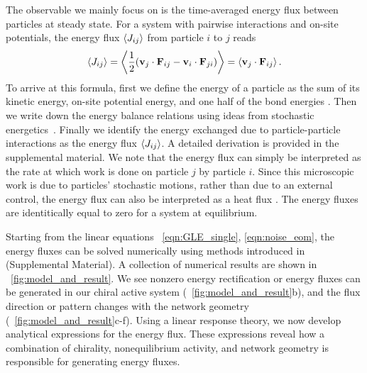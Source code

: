 \documentclass[
 preprint,
 preprintnumbers,
 amsmath,amssymb,
 aps,
 pre,
 longbibliography,
 superscriptaddress,
 10pt, twocolumn
]{revtex4-1}
\begin{document}
The observable we mainly focus on is the time-averaged energy flux between particles at steady state. For a system with pairwise interactions and on-site potentials, the energy flux $\expval{J_{ij}}$ from particle $i$ to $j$ reads
\begin{equation} \label{eqn:flux_def}
    \expval{J_{ij}} = \expval{\frac{1}{2} (\mathbf{v}_j \cdot \mathbf{F}_{ij} - \mathbf{v}_i \cdot \mathbf{F}_{ji})}
    = \expval{\mathbf{v}_j \cdot \mathbf{F}_{ij}}.
\end{equation}
To arrive at this formula, first we define the energy of a particle as the sum of its kinetic energy, on-site potential energy, and one half of the bond energies \cite{Lepri2003ThermalConduction}. Then we write down the energy balance relations using ideas from stochastic energetics~\cite{Sekimoto1998LangevinEquation}. Finally we identify the energy exchanged due to particle-particle interactions as the energy flux $\expval{J_{ij}}$. A detailed derivation is provided in the supplemental material.
We note that the energy flux can simply be interpreted as the rate at which work is done on particle $j$ by particle $i$.
Since this microscopic work is due to particles' stochastic motions, rather than due to an external control, the energy flux can also be interpreted as a heat flux \cite{Sekimoto1998LangevinEquation,Lepri2003ThermalConduction}. The energy fluxes are identitically equal to zero for a system at equilibrium.

Starting from the linear equations \eqnname~\eqref{eqn:GLE_single}, \eqref{eqn:noise_eom}, the energy fluxes can be solved numerically using methods introduced in \cite{Gardiner2009ItoCalculus,Ceriotti2010ColoredNoiseThermostats} (Supplemental Material).
A collection of numerical results are shown in \figurename~\ref{fig:model_and_result}. We see nonzero energy rectification or energy fluxes can be generated in our chiral active system (\figurename~\ref{fig:model_and_result}b), and the flux direction or pattern changes with the network geometry (\figurename~\ref{fig:model_and_result}c-f).
Using a linear response theory, we now develop analytical expressions for the energy flux. These expressions reveal how a combination of chirality, nonequilibrium activity, and network geometry is responsible for generating energy fluxes.
\end{document}
